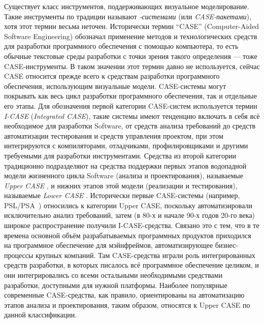 Существует класс инструментов, поддерживающих визуальное моделирование. 
Такие инструменты по традиции называют \textit{-системами} (или \textit{\ac{CASE}-пакетами}), 
хотя этот термин весьма неточен. Исторически термин "`\ac{CASE}"'
(Computer-Aided Software Engineering) обозначал применение методов и 
технологических средств для разработки программного обеспечения с помощью 
компьютера, то есть обычные текстовые среды разработки с точки зрения такого 
определения --- тоже \ac{CASE}-инструменты. В таком значении этот термин давно 
не используется, сейчас \ac{CASE} относится прежде всего к средствам разработки 
программного обеспечения, использующим визуальные модели. \ac{CASE}-системы могут 
покрывать как весь цикл разработки программного обеспечения, так и отдельные 
его этапы. Для обозначения первой категории \ac{CASE}-систем используется термин 
\textit{I-CASE}
(\textit{Integrated CASE}), такие системы имеют тенденцию включать в себя всё 
необходимое для разработки \ac{Software}, от средств анализа требований до средств 
автоматизации тестирования и средств управления проектом, при этом интегрируются 
с компиляторами, отладчиками, профилировщиками и другими требуемыми для 
разработки инструментами. Средства из второй категории традиционно подразделяют 
на средства поддержки первых этапов водопадной модели жизненного цикла \ac{Software} 
(анализа и проектирования), называемые \textit{Upper CASE}%
, и нижних этапов этой модели 
(реализации и тестирования), называемые \textit{Lower CASE}%
. Исторически первые \ac{CASE}-системы (например, PSL/PSA~\cite{teichroew1977psl}) относились к категории Upper CASE, поскольку 
автоматизировали исключительно анализ требований, затем 
(в 80-х и начале 90-х годов 20-го века) широкое распространение получили 
I-CASE-средства. Связано это с тем, что в те времена основной объём 
разрабатываемых программных продуктов приходился на программное обеспечение для 
мэйнфреймов, автоматизирующее бизнес-процессы крупных компаний. Там 
\ac{CASE}-средства играли роль интегрированных средств разработки, в которых 
писалось всё программное обеспечение целиком, и они интегрировались со всеми 
остальными необходимыми средствами разработки, доступными для нужной платформы. 
Наиболее популярные современные \ac{CASE}-средства, как правило, ориентированы на 
автоматизацию этапов анализа и проектирования, таким образом, относятся к 
Upper CASE по данной классификации.

